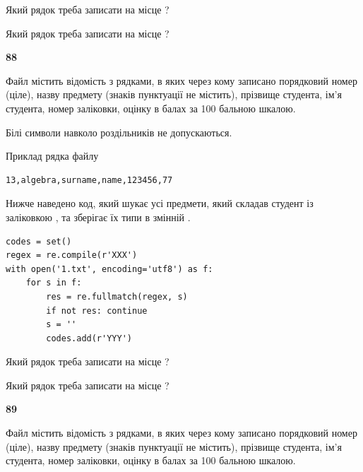 Який рядок треба записати на місце  ?\par
\vspace{5mm}


Який рядок треба записати на місце  ?\par


\newpage

{\begin {center}\textbf{ 88}\end {center}}\par
Файл  містить відомість з рядками, в яких через кому записано поряд\-ковий номер (ціле), назву предмету (знаків пунктуації не містить), прізвище студента, ім'я студента, номер заліковки, оцінку в балах за 100 бальною шкалою.

Білі символи навколо роздільників не допускаються.

Приклад рядка файлу



\begin{verbatim}
13,algebra,surname,name,123456,77
\end{verbatim}


Нижче наведено код, який шукає усі предмети, який складав студент із заліковкою , та зберігає їх типи в змінній .



\begin{verbatim}
codes = set()
regex = re.compile(r'XXX')
with open('1.txt', encoding='utf8') as f:
    for s in f:
        res = re.fullmatch(regex, s)
        if not res: continue
        s = ''
        codes.add(r'YYY')
\end{verbatim}





Який рядок треба записати на місце  ?\par
\vspace{5mm}


Який рядок треба записати на місце  ?\par


\newpage

{\begin {center}\textbf{ 89}\end {center}}\par
Файл  містить відомість з рядками, в яких через кому записа\-но поряд\-ковий номер (ціле), назву предмету (знаків пунктуації не містить), прізвище студента, ім'я студента, номер заліковки, оцінку в балах за 100 бальною шкалою.

